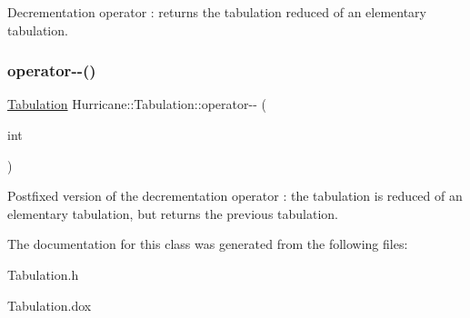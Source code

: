 Decrementation operator \+: returns the tabulation reduced of an elementary tabulation. \mbox{\label{classHurricane_1_1Tabulation_a9bdb9f81cd412ffcfb1da048b75cbd99}} 
\subsubsection{\texorpdfstring{operator-\/-\/()}{operator--()}\hspace{0.1cm}{\footnotesize\ttfamily [2/2]}}
{\footnotesize\ttfamily \mbox{\hyperlink{classHurricane_1_1Tabulation}{Tabulation}} Hurricane\+::\+Tabulation\+::operator-\/-\/ (\begin{DoxyParamCaption}\item[{int}]{ }\end{DoxyParamCaption})}

Postfixed version of the decrementation operator \+: the tabulation is reduced of an elementary tabulation, but returns the previous tabulation. 

The documentation for this class was generated from the following files\+:\begin{DoxyCompactItemize}
\item 
Tabulation.\+h\item 
Tabulation.\+dox\end{DoxyCompactItemize}
